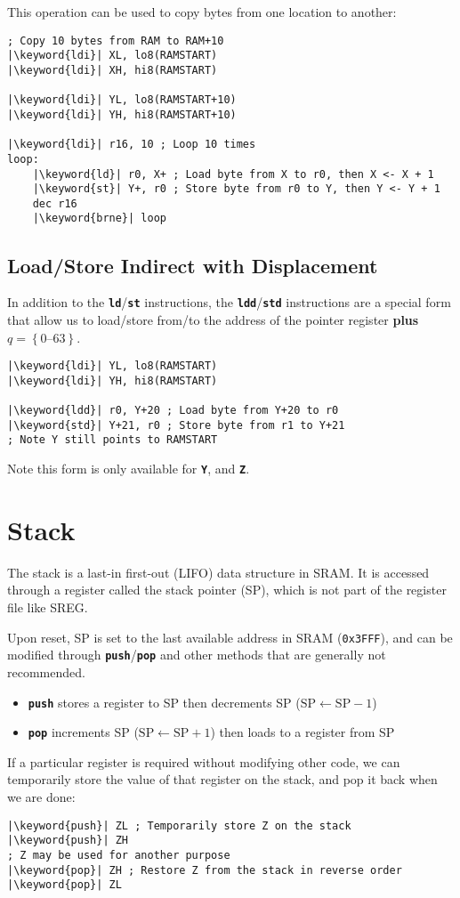 \documentclass[a4paper]{report}
\newcommand{\keyword}[1]{\textcolor[rgb]{0.00,0.50,0.00}{\textbf{#1}}}
\newcommand{\keywordinline}[1]{\textcolor[rgb]{0.00,0.50,0.00}{\textbf{\texttt{#1}}}}
\begin{document}
This operation can be used to copy bytes from one location to another:
\begin{verbatim}
; Copy 10 bytes from RAM to RAM+10
|\keyword{ldi}| XL, lo8(RAMSTART)
|\keyword{ldi}| XH, hi8(RAMSTART)

|\keyword{ldi}| YL, lo8(RAMSTART+10)
|\keyword{ldi}| YH, hi8(RAMSTART+10)

|\keyword{ldi}| r16, 10 ; Loop 10 times
loop:
    |\keyword{ld}| r0, X+ ; Load byte from X to r0, then X <- X + 1
    |\keyword{st}| Y+, r0 ; Store byte from r0 to Y, then Y <- Y + 1
    dec r16
    |\keyword{brne}| loop
\end{verbatim}
\subsection{Load/Store Indirect with Displacement}
In addition to the \keywordinline{ld}/\keywordinline{st} instructions,
the \keywordinline{ldd}/\keywordinline{std} instructions are a special
form that allow us to load/store from/to the address of the pointer
register \textbf{plus} \(q = \left\{ \numrange{0}{63} \right\}\).
\begin{verbatim}
|\keyword{ldi}| YL, lo8(RAMSTART)
|\keyword{ldi}| YH, hi8(RAMSTART)

|\keyword{ldd}| r0, Y+20 ; Load byte from Y+20 to r0
|\keyword{std}| Y+21, r0 ; Store byte from r1 to Y+21
; Note Y still points to RAMSTART
\end{verbatim}
Note this form is only available for \keywordinline{Y}, and
\keywordinline{Z}.
\section{Stack}
The stack is a last-in first-out (LIFO) data structure in SRAM\@. It is
accessed through a register called the stack pointer (SP), which is not
part of the register file like SREG\@.

Upon reset, SP is set to the last available address in SRAM
(\texttt{0x3FFF}), and can be modified through
\keywordinline{push}/\keywordinline{pop} and other methods that are
generally not recommended.%
\begin{itemize}
    \item \keywordinline{push} stores a register to SP then decrements SP (\(\mathrm{SP} \leftarrow \mathrm{SP} - 1\))
    \item \keywordinline{pop} increments SP (\(\mathrm{SP} \leftarrow \mathrm{SP} + 1\)) then loads to a register from SP
\end{itemize}
If a particular register is required without modifying other code, we can temporarily
store the value of that register on the stack, and pop it back when we are done:
\begin{verbatim}
|\keyword{push}| ZL ; Temporarily store Z on the stack
|\keyword{push}| ZH
; Z may be used for another purpose
|\keyword{pop}| ZH ; Restore Z from the stack in reverse order
|\keyword{pop}| ZL
\end{verbatim}
\end{document}
